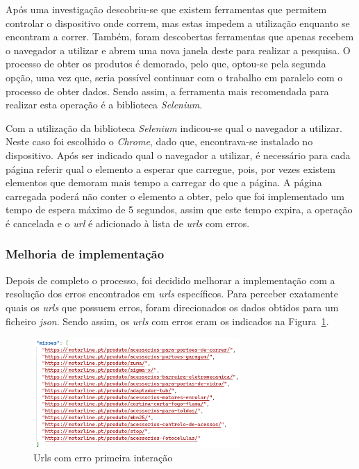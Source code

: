 Após uma investigação descobriu-se que existem ferramentas que permitem controlar o dispositivo onde correm, mas estas impedem a utilização enquanto se encontram a correr. Também, foram descobertas ferramentas que apenas recebem o navegador a utilizar e abrem uma nova janela deste para realizar a pesquisa.
O processo de obter os produtos é demorado, pelo que, optou-se pela segunda opção, uma vez que, seria possível continuar com o trabalho em paralelo com o processo de obter dados. Sendo assim, a ferramenta mais recomendada para realizar esta operação é a biblioteca \textit{Selenium}.

Com a utilização da biblioteca \textit{Selenium} indicou-se qual o navegador a utilizar. Neste caso foi escolhido o \textit{Chrome}, dado que, encontrava-se instalado no dispositivo. Após ser indicado qual o navegador a utilizar, é necessário para cada página referir qual o elemento a esperar que carregue, pois, por vezes existem elementos que demoram mais tempo a carregar do que a página. A página carregada poderá não conter o elemento a obter, pelo que foi implementado um tempo de espera máximo de 5 segundos, assim que este tempo expira, a operação é cancelada e o \textit{url} é adicionado à lista de \textit{urls} com erros.

\newpage


\subsubsection{Melhoria de implementação}

Depois de completo o processo, foi decidido melhorar a implementação com a resolução dos erros encontrados em \textit{urls} específicos. Para perceber exatamente quais os \textit{urls} que possuem erros, foram direcionados os dados obtidos para um ficheiro \textit{\acrshort{json}}. Sendo assim, os \textit{urls} com erros eram os indicados na Figura~\ref{fig:57}.

\begin{figure}[htb]
  \centering
  
  \includegraphics[width=0.7\textwidth]{images/implementacao/scraper/urls_erro_iteracao_1.png}
  \caption{Urls com erro primeira interação}
  \label{fig:57}
\end{figure}

